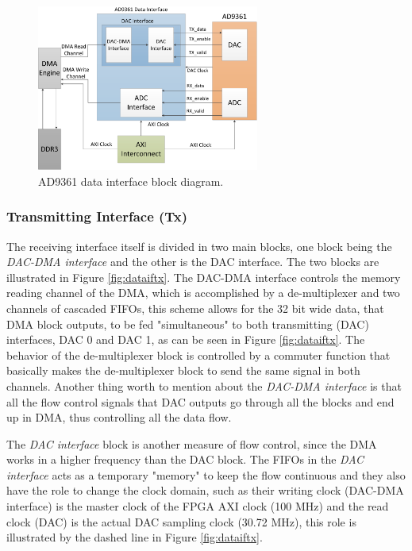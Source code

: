 \begin{figure}[htbp]
    \centering
    \includegraphics[width=0.65\textwidth]{./figures/data_if}
    \caption{ AD9361 data interface block diagram.
    \label{fig:databd}}
\end{figure}

\subsubsection{Transmitting Interface (Tx)}

The receiving interface itself is divided in two main blocks, one block being
the \emph{DAC-DMA interface} and the other is the DAC interface. The two blocks are
illustrated in Figure \ref{fig:dataiftx}. The DAC-DMA interface controls the
memory reading channel of the DMA, which is accomplished by a de-multiplexer
and two channels of cascaded FIFOs, this scheme allows for the 32 bit wide
data, that DMA block outputs, to be fed "simultaneous" to both transmitting
(DAC) interfaces, DAC 0 and DAC 1, as can be seen in Figure \ref{fig:dataiftx}.
The behavior of the de-multiplexer block is controlled by a commuter function
that basically makes the de-multiplexer block to send the same signal in both
channels. Another thing worth to mention about the \emph{DAC-DMA interface} is that
all the flow control signals that DAC outputs go through all the blocks and end
up in DMA, thus controlling all the data flow.

The \emph{DAC interface} block is another measure of flow control, since the DMA
works in a higher frequency than the DAC block. The FIFOs in the \emph{DAC
interface} acts as a temporary "memory" to keep the flow continuous and they
also have the role to change the clock domain, such as their writing clock
(DAC-DMA interface) is the master clock of the FPGA AXI clock (100 MHz) and the
read clock (DAC) is the actual DAC sampling clock (30.72 MHz), this role is
illustrated by the dashed line in Figure \ref{fig:dataiftx}.
%

